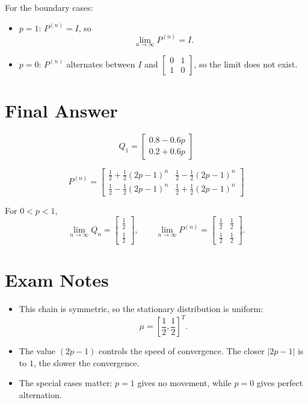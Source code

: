\documentclass[11pt]{article}
\begin{document}
For the boundary cases:
\begin{itemize}
    \item \(p=1\): \(P^{(n)}=I\), so
    \[
        \lim_{n\to\infty}P^{(n)}=I.
    \]
    \item \(p=0\): \(P^{(n)}\) alternates between \(I\) and
    \(\begin{bmatrix}0&1\\1&0\end{bmatrix}\), so the limit does not exist.
\end{itemize}

\section*{Final Answer}

\[
    \boxed{
    Q_1=
    \begin{bmatrix}
        0.8-0.6p\\
        0.2+0.6p
    \end{bmatrix}
    }
\]

\[
    \boxed{
    P^{(n)}
    =
    \begin{bmatrix}
        \frac12+\frac12(2p-1)^n & \frac12-\frac12(2p-1)^n \\
        \frac12-\frac12(2p-1)^n & \frac12+\frac12(2p-1)^n
    \end{bmatrix}
    }
\]

For \(0<p<1\),
\[
    \boxed{
    \lim_{n\to\infty}Q_n
    =
    \begin{bmatrix}
        \frac12\\
        \frac12
    \end{bmatrix},
    \qquad
    \lim_{n\to\infty}P^{(n)}
    =
    \begin{bmatrix}
        \frac12 & \frac12\\
        \frac12 & \frac12
    \end{bmatrix}
    }.
\]

\section*{Exam Notes}

\begin{itemize}
    \item This chain is symmetric, so the stationary distribution is uniform:
    \[
        \mu=\left[\frac12,\frac12\right]^T.
    \]
    \item The value \((2p-1)\) controls the speed of convergence. The closer
    \(|2p-1|\) is to \(1\), the slower the convergence.
    \item The special cases matter:
    \(p=1\) gives no movement, while \(p=0\) gives perfect alternation.
\end{itemize}
\end{document}
